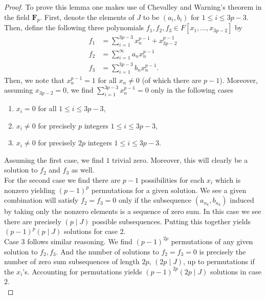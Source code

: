 \begin{proof}
	To prove this lemma one makes use of Chevalley and Warning's theorem in the field \(\textbf{F}_{p}\). First, denote the elements of \(J\) to be \(\left( a_{i}, b_{i} \right) \) for \(1 \le i \le 3p-3\). Then, define the following three polynomials \(f_1, f_2, f_3 \in F \left[ x_1, \ldots, x_{3p-2} \right] \) by
	\begin{align*}
		f_1 &= \sum_{i= 1}^{3p-3} x_{n}^{p-1} + x_{3p-2}^{p-1}\\
		f_2 &= \sum_{i= 1}^{\infty} a_{n} x_{n}^{p-1} \\
		f_3 &=  \sum_{i= 1}^{3p-3} b_{n} x_{n}^{p-1}
	.\end{align*}
	Then, we note that \(x_{n}^{p-1} = 1\) for all \(x_{n} \neq 0\) (of which there are \(p-1\)). Moreover, assuming \(x_{3p-2} = 0\), we find \(\sum_{i= 1}^{3p-3} x_{n}^{p-1} = 0\) only in the following cases
	\begin{enumerate}
		\item \(x_{i} = 0\) for all \(1 \le i \le 3p-3\),
		\item \(x_{i}\neq 0\) for precisely \(p\) integers \(1 \le i \le 3p-3\),
		\item \(x_{i} \neq 0\) for precisely \(2p\) integers \(1 \le i \le 3p-3\).
	\end{enumerate}
	Assuming the first case, we find \(1\) trivial zero. Moreover, this will clearly be a solution to \(f_2\) and \(f_3\) as well.\\
	For the second case we find there are \(p-1\) possibilities for each \(x_{i}\) which is nonzero yielding \(\left( p-1 \right) ^{p}\) permutations for a given solution. We see a given combination will satisfy \(f_2 = f_3  = 0\) only if the subsequence \(\left( a_{n_{k}} , b_{n_{k}}\right) \) induced by taking only the nonzero elements is a sequence of zero sum. In this case we see there are precisely \(\left( p \mid J \right) \) possible subsequences. Putting this together yields \(\left( p-1 \right) ^{p} \left( p \mid J \right) \) solutions for case \(2\).\\
	Case \(3\) follows similar reasoning. We find \(\left( p-1 \right) ^{2p}\) permutations of any given solution to \(f_2, f_3\). And the number of solutions to \(f_2 = f_3 = 0\) is precisely the number of zero sum subsequences of length \(2p\), \(\left( 2p \mid  J \right) \),  up to permutations if the \(x_{i}\)'s. Accounting for permutations yields \(\left( p-1 \right) ^{2p} \left( 2p \mid J \right) \) solutions in case \(2\).\\

\end{proof}
